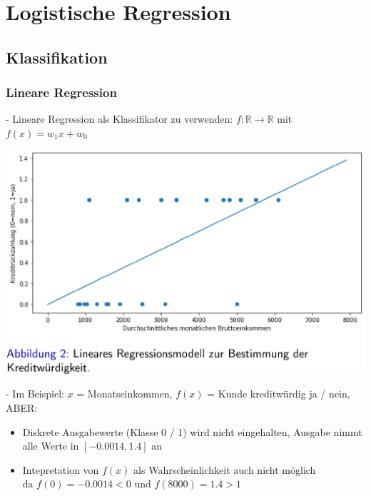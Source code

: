 \documentclass{report}
\begin{document}
  \chapter{Logistische Regression}	
  \section{Klassifikation}	
  \subsection{Lineare Regression}	
  - Lineare Regression als Klassifikator zu verwenden: $f: \mathbb{R} \rightarrow \mathbb{R}$	
  mit $f(x) = w_1x + w_0$	
  \begin{center}	
    \includegraphics[scale=.215]{ml03_1}	
  \end{center}	
  - Im Beispiel: $x$ = Monatseinkommen, $f(x)$ = Kunde kreditwürdig ja / nein, ABER:\\	
  \vspace*{-1.25em}	
  \begin{itemize}	
    \item Diskrete Ausgabewerte (Klasse 0 / 1) wird nicht eingehalten, Ausgabe nimmt alle Werte in $[-0.0014, 1.4]$ an	
    \item Intepretation von $f(x)$ als Wahrscheinlichkeit auch nicht möglich\\	
    da $f(0) = -0.0014 < 0$ und $f(8000) = 1.4 > 1$	
  \end{itemize}	
  
\end{document}

